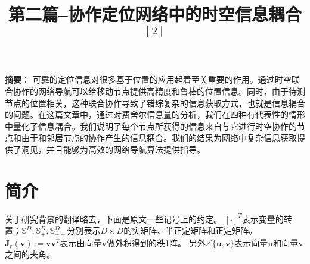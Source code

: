  
%
\title{第二篇--协作定位网络中的时空信息耦合$^{[2]}$} 
\textbf{摘要}：%
可靠的定位信息对很多基于位置的应用起着至关重要的作用。通过时空联合协作的网络导航可以给移动节点提供高精度和鲁棒的位置信息。同时，由于待测节点的位置相关，这种联合协作导致了错综复杂的信息获取方式，也就是信息耦合的问题。在这篇文章中，通过对费舍尔信息量的分析，我们在四种有代表性的情形中量化了信息耦合。我们说明了每个节点所获得的信息来自与它进行时空协作的节点和由于和邻居节点的协作产生的信息耦合。我们的结果为网络中复杂信息获取提供了洞见，并且能够为高效的网络导航算法提供指导。
\setcounter{section}{0}
\section{简介}
关于研究背景的翻译略去，下面是原文一些记号上的约定。
$[\cdot]^T$表示变量的转置；$\mathbb{S}^D,\mathbb{S}^D_+,\mathbb{S}^D_{++}$分别表示$D\times D$的实矩阵、半正定矩阵和正定矩阵。$\bm{J}_r(\bm{v}):=\bm{v}\bm{v}^T$表示由向量$\bm{v}$做外积得到的秩1阵。
另外$\angle \{ \bm{u},\bm{v}\}
$表示向量$\bm{u}$和向量$\bm{v}$之间的夹角。
